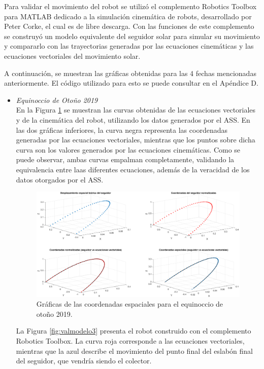Para validar el movimiento del robot se utilizó el complemento Robotics Toolbox para MATLAB dedicado a la simulación cinemática de robots, desarrollado por Peter Corke, el cual es de libre descarga. Con las funciones de este complemento se construyó un modelo equivalente del seguidor solar para simular su movimiento y compararlo con las trayectorias generadas por las ecuaciones cinemáticas y las ecuaciones vectoriales del movimiento solar.

A continuación, se muestran las gráficas obtenidas para las 4 fechas mencionadas anteriormente. El código utilizado para esto se puede consultar en el Apéndice D.
\begin{itemize}
    \item \textit{Equinoccio de Otoño 2019}\\
    En la Figura \ref{fig:valmodelo2} se muestran las curvas obtenidas de las ecuaciones vectoriales y de la cinemática del robot, utilizando los datos generados por el ASS. En las dos gráficas inferiores, la curva negra representa las coordenadas generadas por las ecuaciones vectoriales, mientras que los puntos sobre dicha curva son los valores generados por las ecuaciones cinemáticas. Como se puede observar, ambas curvas empalman completamente, validando la equivalencia entre laas diferentes ecuaciones, además de la veracidad de los datos otorgados por el ASS.
    \begin{figure}[H]
    	\centering
    	\includegraphics[width=12.5cm]{imagenes/valmodelo2}
    	\caption{Gráficas de las coordenadas espaciales para el equinoccio de otoño 2019.}
    	\label{fig:valmodelo2}
    \end{figure}
    La Figura \ref{fig:valmodelo3} presenta el robot construido con el complemento Robotics Toolbox. La curva roja corresponde a las ecuaciones vectoriales, mientras que la azul describe el movimiento del punto final del eslabón final del seguidor, que vendría siendo el colector.

\end{itemize}
